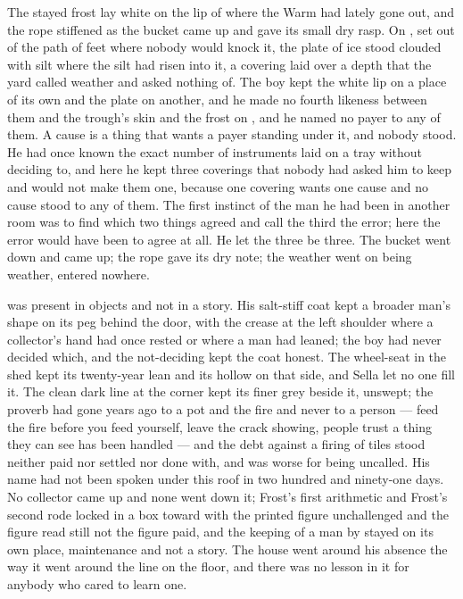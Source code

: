 The stayed frost lay white on the lip of  where the Warm had lately gone out, and the rope stiffened as the bucket came up and gave its small dry rasp. On , set out of the path of feet where nobody would knock it, the plate of ice stood clouded with silt where the silt had risen into it, a covering laid over a depth that the yard called weather and asked nothing of. The boy kept the white lip on a place of its own and the plate on another, and he made no fourth likeness between them and the trough's skin and the frost on , and he named no payer to any of them. A cause is a thing that wants a payer standing under it, and nobody stood. He had once known the exact number of instruments laid on a tray without deciding to, and here he kept three coverings that nobody had asked him to keep and would not make them one, because one covering wants one cause and no cause stood to any of them. The first instinct of the man he had been in another room was to find which two things agreed and call the third the error; here the error would have been to agree at all. He let the three be three. The bucket went down and came up; the rope gave its dry note; the weather went on being weather, entered nowhere.

\scenebreak

 was present in objects and not in a story. His salt-stiff coat kept a broader man's shape on its peg behind the door, with the crease at the left shoulder where a collector's hand had once rested or where a man had leaned; the boy had never decided which, and the not-deciding kept the coat honest. The wheel-seat in the shed kept its twenty-year lean and its hollow on that side, and Sella let no one fill it. The clean dark line at the corner kept its finer grey beside it, unswept; the proverb had gone years ago to a pot and the fire and never to a person --- feed the fire before you feed yourself, leave the crack showing, people trust a thing they can see has been handled --- and the debt against a firing of tiles stood neither paid nor settled nor done with, and was worse for being uncalled. His name had not been spoken under this roof in two hundred and ninety-one days. No collector came up  and none went down it; Frost's first arithmetic and Frost's second rode locked in a box toward  with the printed figure unchallenged and the figure read still not the figure paid, and the keeping of a man by  stayed on its own place, maintenance and not a story. The house went around his absence the way it went around the line on the floor, and there was no lesson in it for anybody who cared to learn one.

